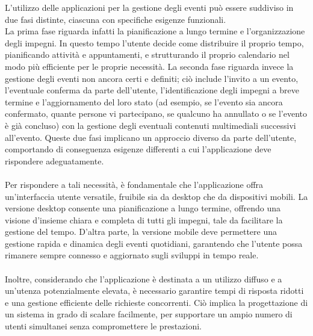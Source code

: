L’utilizzo delle applicazioni per la gestione degli eventi può essere suddiviso in due fasi distinte, ciascuna con specifiche esigenze funzionali.\\
La prima fase riguarda infatti la pianificazione a lungo termine e l’organizzazione degli impegni.
In questo tempo l’utente decide come distribuire il proprio tempo, pianificando attività e appuntamenti,
e strutturando il proprio calendario nel modo più efficiente per le proprie necessità.
La seconda fase riguarda invece la gestione degli eventi non ancora certi e definiti;
ciò include l’invito a un evento, l’eventuale conferma da parte dell’utente,
l’identificazione degli impegni a breve termine e l’aggiornamento del loro stato
(ad esempio, se l’evento sia ancora confermato, quante persone vi partecipano, se qualcuno ha annullato o se l'evento è già concluso)
con la gestione degli eventuali contenuti multimediali successivi all’evento. Queste due fasi implicano un approccio diverso da parte dell’utente,
comportando di conseguenza esigenze differenti a cui l’applicazione deve rispondere adeguatamente.\\
\\
Per rispondere a tali necessità, è fondamentale che l'applicazione offra un'interfaccia utente versatile, fruibile sia da desktop che da dispositivi mobili.
La versione desktop consente una pianificazione a lungo termine, offrendo una visione d'insieme chiara e completa di tutti gli impegni,
tale da facilitare la gestione del tempo.
D'altra parte, la versione mobile deve permettere una gestione rapida e dinamica degli eventi quotidiani,
garantendo che l'utente possa rimanere sempre connesso e aggiornato sugli sviluppi in tempo reale.\\
\\
Inoltre, considerando che l'applicazione è destinata a un utilizzo diffuso e a un'utenza potenzialmente elevata,
è necessario garantire tempi di risposta ridotti e una gestione efficiente delle richieste concorrenti.
Ciò implica la progettazione di un sistema in grado di scalare facilmente,
per supportare un ampio numero di utenti simultanei senza compromettere le prestazioni.\\
\\
\clearpage


